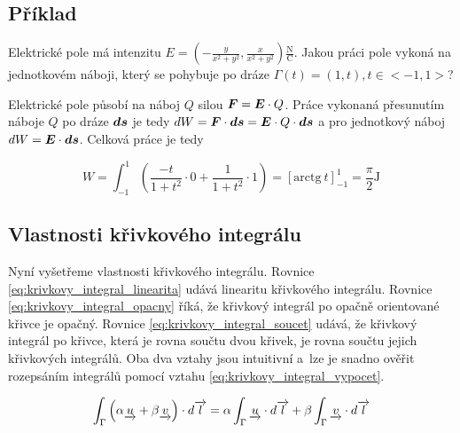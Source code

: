 \subsection{Příklad}

Elektrické pole má intenzitu \(E = \left(-\frac{y}{x^2+y^2}, \frac{x}{x^2+y^2}\right) \frac{\mathrm{N}}{\mathrm{C}}\). Jakou práci pole vykoná na jednotkovém náboji, který se pohybuje po dráze \(\Gamma(t) = (1, t), t \in <-1, 1>\)?




Elektrické pole působí na náboj \(Q\) silou \(\boldsymbol{F} = \boldsymbol{E} \cdot Q\). Práce vykonaná přesunutím náboje \(Q\) po dráze \(\boldsymbol{ds}\) je tedy \(dW = \boldsymbol{F} \cdot \boldsymbol{ds} = \boldsymbol{E} \cdot Q \cdot \boldsymbol{ds}\) a pro jednotkový náboj \(dW = \boldsymbol{E} \cdot \boldsymbol{ds}\). Celková práce je tedy

\[
W = \int_{-1}^1 \left (\frac{-t}{1 + t^2} \cdot 0 + \frac{1}{1 + t^2} \cdot 1 \right) = \left[\mathrm{arctg} \ t\right]_{-1}^1 = \frac{\pi}{2} \mathrm{J}
\]

\subsection{Vlastnosti křivkového integrálu}

Nyní vyšetřeme vlastnosti křivkového integrálu. Rovnice \eqref{eq:krivkovy_integral_linearita} udává linearitu křivkového integrálu. Rovnice \eqref{eq:krivkovy_integral_opacny} říká, že křivkový integrál po opačně orientované křivce je opačný. Rovnice \eqref{eq:krivkovy_integral_soucet} udává, že křivkový integrál po křivce, která je rovna součtu dvou křivek, je rovna součtu jejich křivkových integrálů. Oba dva vztahy jsou intuitivní a~lze je snadno ověřit rozepsáním integrálů pomocí vztahu \eqref{eq:krivkovy_integral_vypocet}.

\begin{equation}
\label{eq:krivkovy_integral_linearita}
\begin{split}
\int_{\Gamma} \left(\alpha \underrightarrow{u} + \beta \underrightarrow{v}\right) \cdot d\overrightarrow{l} = \alpha \int_{\Gamma} \underrightarrow{u} \cdot d\overrightarrow{l} + \beta \int_{\Gamma} \underrightarrow{v} \cdot d\overrightarrow{l}
\end{split}
\end{equation}

